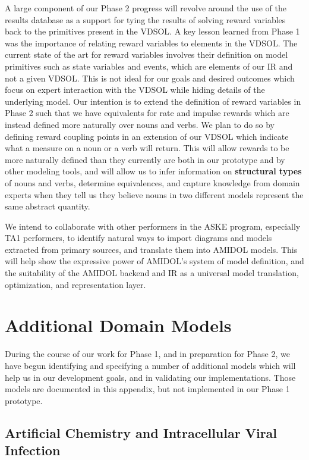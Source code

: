 \documentclass[11pt]{article}
\newcommand{\amidol}{\textsc{AMIDOL}}
\begin{document}
A large component of our Phase 2 progress will revolve around the use of the results database as a support for tying the results of solving reward variables back to the primitives present in the VDSOL.  A key lesson learned from Phase 1 was the importance of relating reward variables to elements in the VDSOL.  The current state of the art for reward variables involves their definition on model primitives such as state variables and events, which are elements of our IR and not a given VDSOL.  This is not ideal for our goals and desired outcomes which focus on expert interaction with the VDSOL while hiding details of the underlying model.  Our intention is to extend the definition of reward variables in Phase 2 such that we have equivalents for rate and impulse rewards which are instead defined more naturally over nouns and verbs.  We plan to do so by defining reward coupling points in an extension of our VDSOL which indicate what a measure on a noun or a verb will return.  This will allow rewards to be more naturally defined than they currently are both in our prototype and by other modeling tools, and will allow us to infer information on \textbf{structural types} of nouns and verbs, determine equivalences, and capture knowledge from domain experts when they tell us they believe nouns in two different models represent the same abstract quantity.

We intend to collaborate with other performers in the ASKE program, especially TA1 performers, to identify natural ways to import diagrams and models extracted from primary sources, and translate them into \amidol{} models.  This will help show the expressive power of \amidol{}'s system of model definition, and the suitability of the \amidol{} backend and IR as a universal model translation, optimization, and representation layer.



\appendix
\section{Additional Domain Models}

During the course of our work for Phase 1, and in preparation for Phase 2, we have begun identifying and specifying a number of additional models which will help us in our development goals, and in validating our implementations.  Those models are documented in this appendix, but not implemented in our Phase 1 prototype.

\subsection{Artificial Chemistry and Intracellular Viral Infection}
\end{document}
